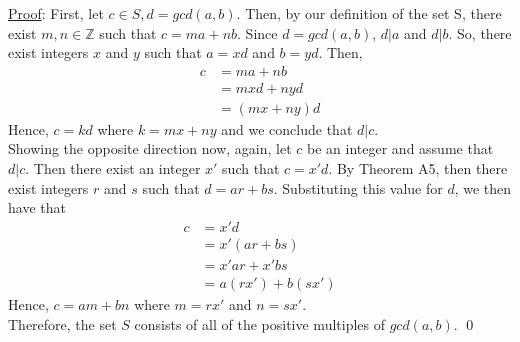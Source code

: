 \documentclass{article}
\begin{document}
\noindent
\underline{Proof}: 
First, let $c \in S, d = gcd(a, b)$. Then, by our definition of the set S, there exist $m, n \in \mathbb{Z}$ such that $c = ma + nb$. Since $d = gcd(a, b)$, $d \rvert a$ and $d \rvert b$. So, there exist integers $x$ and $y$ such that $a = xd$ and $b = yd$. Then,
\begin{align*}
c &= ma + nb \\
&= mxd + nyd \\
&= (mx + ny)d
\end{align*}
Hence, $c = kd$ where $k = mx + ny$ and we conclude that $d \rvert c$. \\

\noindent
Showing the opposite direction now, again, let $c$ be an integer and assume that $d \rvert c$. Then there exist an integer $x'$ such that $c = x'd$. By Theorem A5, then there exist integers $r$ and $s$ such that $d = ar + bs$. Substituting this value for $d$, we then have that
\begin{align*}
c &= x'd \\
&= x'(ar + bs) \\
&= x'ar + x'bs \\
&= a(rx') + b(sx')
\end{align*}
Hence, $c = am + bn$ where $m = rx'$ and $n = sx'$. \\

\noindent
Therefore, the set $S$ consists of all of the positive multiples of $gcd(a, b)$. \qed \\
\end{document}
